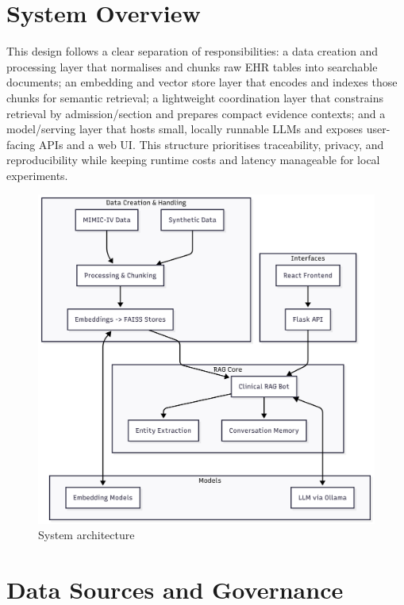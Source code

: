 \section{System Overview}

This design follows a clear separation of responsibilities: a data creation and processing layer that normalises and chunks raw EHR tables into searchable documents; an embedding and vector store layer that encodes and indexes those chunks for semantic retrieval; a lightweight coordination layer that constrains retrieval by admission/section and prepares compact evidence contexts; and a model/serving layer that hosts small, locally runnable LLMs and exposes user-facing APIs and a web UI. This structure prioritises traceability, privacy, and reproducibility while keeping runtime costs and latency manageable for local experiments.
\begin{figure}[H]
  \centering
  \includegraphics[width=0.95\linewidth]{chap3_methodology/images/system_archi.png}
  \caption{System architecture}
  \label{fig:system_architecture}
\end{figure}

\section{Data Sources and Governance}

